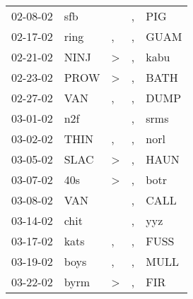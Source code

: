 \begin{supertabular}{p{0.07\textwidth}p{0.06\textwidth}p{0.02\textwidth}p{0.02\textwidth}p{0.06\textwidth}}
          02-08-02\textsuperscript{} &            sfb\textsuperscript{} &                  &                , &            PIG\textsuperscript{} \\
          02-17-02\textsuperscript{} &           ring\textsuperscript{} &                , &                , &           GUAM\textsuperscript{} \\
          02-21-02\textsuperscript{} &           NINJ\textsuperscript{} &     \textgreater &                , &           kabu\textsuperscript{} \\
          02-23-02\textsuperscript{} &           PROW\textsuperscript{} &     \textgreater &                , &           BATH\textsuperscript{} \\
          02-27-02\textsuperscript{} &            VAN\textsuperscript{} &                , &                , &           DUMP\textsuperscript{} \\
          03-01-02\textsuperscript{} &            n2f\textsuperscript{} &                  &                , &           srms\textsuperscript{} \\
          03-02-02\textsuperscript{} &           THIN\textsuperscript{} &                , &                , &           norl\textsuperscript{} \\
          03-05-02\textsuperscript{} &           SLAC\textsuperscript{} &     \textgreater &                , &           HAUN\textsuperscript{} \\
          03-07-02\textsuperscript{} &            40s\textsuperscript{} &     \textgreater &                , &           botr\textsuperscript{} \\
          03-08-02\textsuperscript{} &            VAN\textsuperscript{} &                  &                , &           CALL\textsuperscript{} \\
          03-14-02\textsuperscript{} &           chit\textsuperscript{} &                  &                , &            yyz\textsuperscript{} \\
          03-17-02\textsuperscript{} &           kats\textsuperscript{} &                , &                , &           FUSS\textsuperscript{} \\
          03-19-02\textsuperscript{} &           boys\textsuperscript{} &                , &                , &           MULL\textsuperscript{} \\
          03-22-02\textsuperscript{} &           byrm\textsuperscript{} &     \textgreater &                , &            FIR\textsuperscript{} \\

\end{supertabular}
